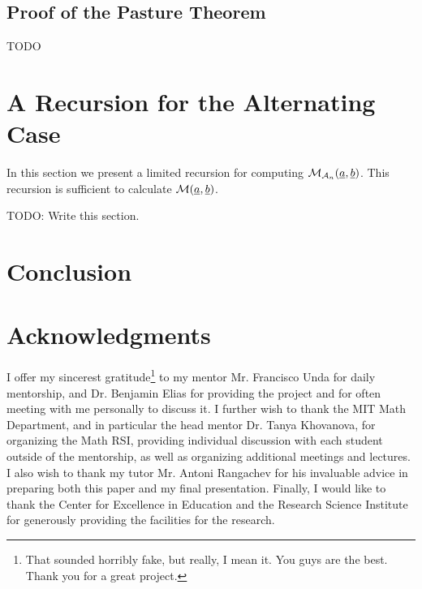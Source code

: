 \subsection{Proof of the Pasture Theorem}
TODO

\section{A Recursion for the Alternating Case}
In this section we present a limited recursion for computing $\mathcal M_{\mathcal A_n}(\underline{a}, \underline{b})$.  This recursion is sufficient to calculate $\mathcal M(\underline{a}, \underline{b})$.

TODO: Write this section.

\section{Conclusion}

\section{Acknowledgments} 
I offer my sincerest gratitude\footnote{That sounded horribly fake, but really, I mean it.  You guys are the best.  Thank you for a great project.} to my mentor Mr. Francisco Unda for daily mentorship, and Dr. Benjamin Elias for providing the project and for often meeting with me personally to discuss it.
I further wish to thank the MIT Math Department, and in particular the head mentor Dr. Tanya Khovanova, for organizing the Math RSI, providing individual discussion with each student outside of the mentorship, as well as organizing additional meetings and lectures.
I also wish to thank my tutor Mr. Antoni Rangachev for his invaluable advice in preparing both this paper and my final presentation.
Finally, I would like to thank the Center for Excellence in Education and the Research Science Institute for generously providing the facilities for the research.


